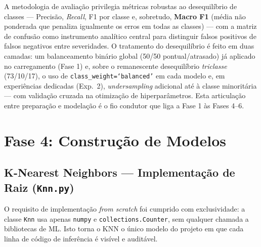 \documentclass[conference]{IEEEtran}
\begin{document}
A metodologia de avaliação privilegia métricas robustas ao desequilíbrio de
classes — Precisão, \textit{Recall}, F1 por classe e, sobretudo, \textbf{Macro
F1} (média não ponderada que penaliza igualmente os erros em todas as classes)
— com a matriz de confusão como instrumento analítico central para distinguir
falsos positivos de falsos negativos entre severidades. O tratamento do
desequilíbrio é feito em duas camadas: um balanceamento binário global
(50/50 pontual/atrasado) já aplicado no carregamento (Fase 1) e, sobre o
remanescente desequilíbrio \emph{triclasse} (73/10/17), o uso de
\texttt{class\_weight=`balanced'} em cada modelo e, em experiências dedicadas
(Exp.~2), \textit{undersampling} adicional até à classe minoritária — com
validação cruzada na otimização de hiperparâmetros. Esta articulação entre
preparação e modelação é o fio condutor que liga a Fase 1 às Fases 4–6.

\section{Fase 4: Construção de Modelos}

\subsection{K-Nearest Neighbors — Implementação de Raiz (\texttt{Knn.py})}

O requisito de implementação \textit{from scratch} foi cumprido com exclusividade:
a classe \texttt{Knn} usa apenas \texttt{numpy} e \texttt{collections.Counter},
sem qualquer chamada a bibliotecas de ML. Isto torna o KNN o único modelo do
projeto em que cada linha de código de inferência é visível e auditável.
\end{document}
